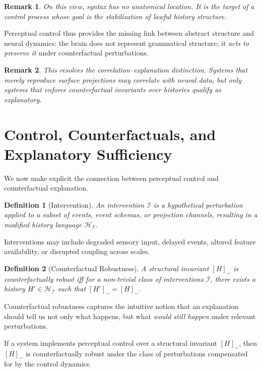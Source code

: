 \documentclass[11pt]{article}
\newtheorem{definition}{Definition}
\newtheorem{remark}{Remark}
\begin{document}
\begin{remark}
On this view, syntax has no anatomical location. It is the target of a control process whose goal is the stabilization of lawful history structure.
\end{remark}

Perceptual control thus provides the missing link between abstract structure and neural dynamics: the brain does not represent grammatical structure; it \emph{acts to preserve it} under counterfactual perturbations.

\begin{remark}
This resolves the correlation–explanation distinction. Systems that merely reproduce surface projections may correlate with neural data, but only systems that enforce counterfactual invariants over histories qualify as explanatory.
\end{remark}

\section{Control, Counterfactuals, and Explanatory Sufficiency}

We now make explicit the connection between perceptual control and counterfactual explanation.

\begin{definition}[Intervention]
An \emph{intervention} $\mathcal{I}$ is a hypothetical perturbation applied to a subset of events, event schemas, or projection channels, resulting in a modified history language $\mathcal{H}_{\mathcal{I}}$.
\end{definition}

Interventions may include degraded sensory input, delayed events, altered feature availability, or disrupted coupling across scales.

\begin{definition}[Counterfactual Robustness]
A structural invariant $[H]_{\sim}$ is \emph{counterfactually robust} iff for a non-trivial class of interventions $\mathcal{I}$, there exists a history $H' \in \mathcal{H}_{\mathcal{I}}$ such that $[H']_{\sim} = [H]_{\sim}$.
\end{definition}

Counterfactual robustness captures the intuitive notion that an explanation should tell us not only what happens, but what \emph{would still happen} under relevant perturbations.

\begin{lemma}
If a system implements perceptual control over a structural invariant $[H]_{\sim}$, then $[H]_{\sim}$ is counterfactually robust under the class of perturbations compensated for by the control dynamics.
\end{lemma}
\end{document}
